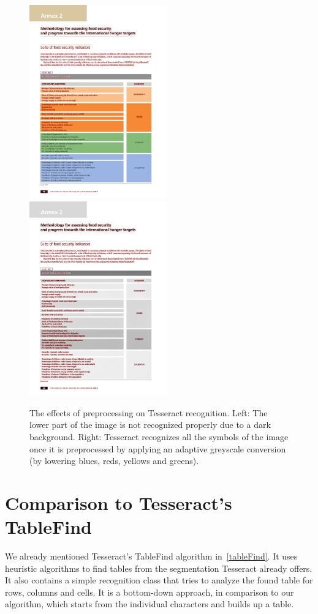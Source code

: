 \begin{figure}[t]
\centering

\includegraphics[width=16em]{img/results/im2_noPreproc.png}
\includegraphics[width=16em]{img/results/im2_Preproc.png}

\caption{The effects of preprocessing on Tesseract recognition. Left: The lower part of the image is not recognized properly due to a dark background. Right: Tesseract recognizes all the symbols of the image once it is preprocessed by applying an adaptive greyscale conversion (by lowering blues, reds, yellows and greens).}
\label{fig:preprocessEffectsAdapt}
\end{figure}

\section{Comparison to Tesseract's TableFind} \label{resultsTableFind}

We already mentioned Tesseract's TableFind algorithm in~\cref{tableFind}. It uses heuristic algorithms to find tables from the segmentation Tesseract already offers. It also contains a simple recognition class that tries to analyze the found table for rows, columns and cells. It is a bottom-down approach, in comparison to our algorithm, which starts from the individual characters and builds up a table.

